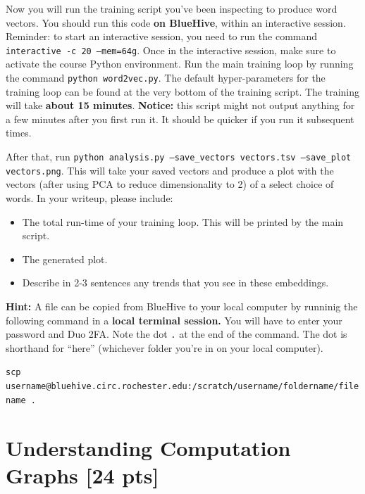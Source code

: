 \documentclass[11pt]{article}
\begin{document}
\newpage
{} Now you will run the training script you've been inspecting to produce word vectors. You should run this code \textbf{on BlueHive}, within an interactive session. Reminder: to start an interactive session, you need to run the command \texttt{interactive -c 20 --mem=64g}. Once in the interactive session, make sure to activate the course Python environment. Run the main training loop by running the command \texttt{python word2vec.py}. The default hyper-parameters for the training loop can be found at the very bottom of the training script. The training will take \textbf{about 15 minutes}. \textbf{Notice:} this script might not output anything for a few minutes after you first run it. It should be quicker if you run it subsequent times.

After that, run \texttt{python analysis.py --save\_vectors vectors.tsv --save\_plot vectors.png}.  This will take your saved vectors and produce a plot with the vectors (after using PCA to reduce dimensionality to 2) of a select choice of words.  In your writeup, please include: 
\begin{itemize}
  \item The total run-time of your training loop.  This will be printed by the main script.
  \item The generated plot.
  \item Describe in 2-3 sentences any trends that you see in these embeddings.
\end{itemize}

\noindent \textbf{Hint:} A file can be copied from BlueHive to your local computer by runninig the following command in a \textbf{local terminal session.} You will have to enter your password and Duo 2FA. Note the dot \texttt{.} at the end of the command. The dot is shorthand for ``here'' (whichever folder you're in on your local computer).

\noindent \texttt{scp username@bluehive.circ.rochester.edu:/scratch/username/foldername/filename .}

\section{Understanding Computation Graphs [24 pts]}
\end{document}
